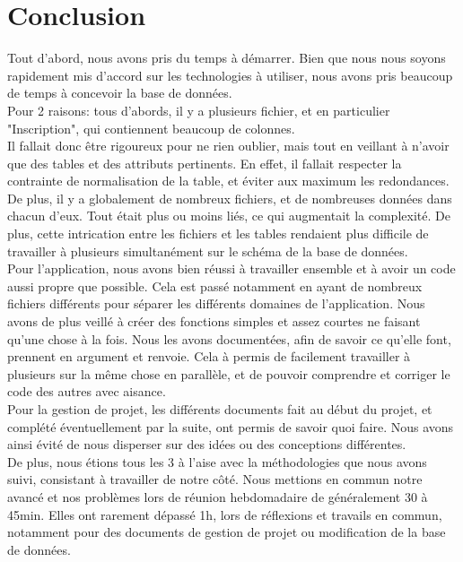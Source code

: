 \chapter{Conclusion}

Tout d'abord, nous avons pris du temps à démarrer. Bien que nous nous soyons rapidement mis d'accord sur les technologies à utiliser, nous avons pris beaucoup de temps à concevoir la base de données.\\

Pour 2 raisons: tous d'abords, il y a plusieurs fichier, et en particulier "Inscription", qui contiennent beaucoup de colonnes.\\

Il fallait donc être rigoureux pour ne rien oublier, mais tout en veillant à n'avoir que des tables et des attributs pertinents. En effet,
il fallait respecter la contrainte de normalisation de la table, et éviter aux maximum les redondances.\\

De plus, il y a globalement de nombreux fichiers, et de nombreuses données dans chacun d'eux. Tout était plus ou moins liés, ce qui augmentait la complexité.
De plus, cette intrication entre les fichiers et les tables rendaient plus difficile de travailler à plusieurs simultanément sur le schéma de la base de données.\\


Pour l'application, nous avons bien réussi à travailler ensemble et à avoir un code aussi propre que possible. Cela est passé notamment en ayant de nombreux fichiers différents pour séparer les différents domaines de l'application. Nous avons de plus veillé à créer des fonctions simples et assez courtes ne faisant qu'une chose à la fois. Nous les avons documentées, afin de savoir ce qu'elle font, prennent en argument et renvoie. Cela à permis de facilement travailler à plusieurs sur la même chose en parallèle, et de pouvoir comprendre et corriger le code des autres avec aisance.\\


Pour la gestion de projet, les différents documents fait au début du projet, et complété éventuellement par la suite, ont permis de savoir quoi faire. 
Nous avons ainsi évité de nous disperser sur des idées ou des conceptions différentes.\\

De plus, nous étions tous les 3 à l'aise avec la méthodologies que nous avons suivi, consistant à travailler de notre côté.
Nous mettions en commun notre avancé et nos problèmes lors de réunion hebdomadaire de généralement 30 à 45min. Elles ont rarement dépassé 1h, lors de réflexions et travails en commun, notamment pour des documents de gestion de projet ou modification de la base de données.




